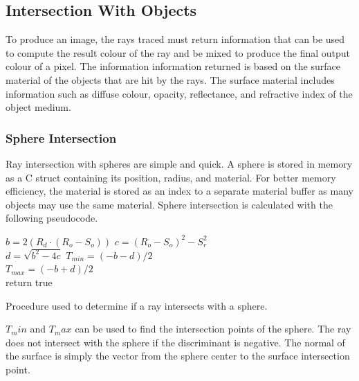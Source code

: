 \documentclass[final]{cmpreport}
\begin{document}
\subsection{Intersection With Objects}

To produce an image, the rays traced must return information that can be used to compute the result colour of the ray and be mixed to produce the final output colour of a pixel. The information information returned is based on the surface material of the objects that are hit by the rays. The surface material includes information such as diffuse colour, opacity, reflectance, and refractive index of the object medium.

\subsubsection{Sphere Intersection}

Ray intersection with spheres are simple and quick. A sphere is stored in memory as a C struct containing its position, radius, and material. For better memory efficiency, the material is stored as an index to a separate material buffer as many objects may use the same material. Sphere intersection is calculated with the following pseudocode.

\begin{algorithm}[H]
    \SetAlgoLined

    $b = 2(R_d \cdot (R_o - S_o))$ 
    $c = (R_o - S_o)^2 - S_r^2$ \\
    $d = \sqrt{b^2 - 4c}$ 
    $T_{min} = (-b - d) / 2$ \\
    $T_{max} = (-b + d) / 2$ \\

    return true

\caption{Procedure used to determine if a ray intersects with a sphere.}
\end{algorithm}

$T_min$ and $T_max$ can be used to find the intersection points of the sphere. The ray does not intersect with the sphere if the discriminant is negative. The normal of the surface is simply the vector from the sphere center to the surface intersection point.
\end{document}
